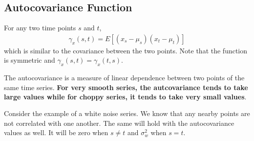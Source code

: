 \documentclass[../../time_series_notes.tex]{subfiles}
\begin{document}
\subsection{Autocovariance Function}
For any two time points $s$ and $t$,
\begin{align*}
    \gamma_{x}(s, t) = E[(x_{s} - \mu_{s})(x_{t} - \mu_{t})]
\end{align*}
which is similar to the covariance between the two points. Note that the function is symmetric and $\gamma_{x}(s, t) = \gamma_{x}(t, s)$.\newline

The autocovariance is a measure of linear dependence between two points of the same time series. \textbf{For very smooth series, the autcovariance tends to take large values while for choppy series, it tends to take very small values}.\newline

Consider the example of a white noise series. We know that any nearby points are not correlated with one another. The same will hold with the autocovariance values as well. It will be zero when $s \neq t$ and $\sigma_{w}^{2}$ when $s = t$.\newline
\end{document}
